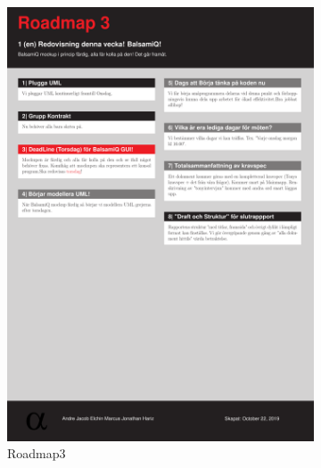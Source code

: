 \documentclass{article}
\theoremstyle{remark}                                         %
\begin{document}
\begin{figure}
\begin{subfigure}[b]{0.3\textwidth}
        \includegraphics[width=\textwidth]{img/OBJKURS1_Roadmap3.pdf}
        \caption{Roadmap3}
        \label{fig:road3}
    \end{subfigure}
    \begin{subfigure}[b]{0.3\textwidth}

\end{subfigure}
\end{figure}
\end{document}
